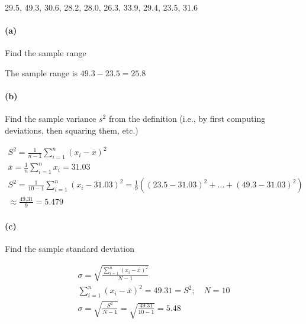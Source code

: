     29.5, 49.3, 30.6, 28.2, 28.0, 26.3, 33.9, 29.4, 23.5, 31.6

    \paragraph*{(a)}
    Find the sample range

    \begin{mdframed}
        The sample range is $49.3 - 23.5 = \boxed{25.8}$
    \end{mdframed}

    \paragraph*{(b)}
    Find the sample variance $s^2$ from the definition (i.e., by first computing deviations, then squaring them, etc.)

    \begin{mdframed}
        \begin{equation*}
            \begin{gathered}
                S^2 = \frac{1}{n-1}\sum_{i=1}^{n}(x_{i}-\overline{x})^2 \\
                \overline{x} = \frac{1}{n}\sum_{i=1}^{n}x_i = 31.03 \\
                S^2 = \frac{1}{10-1}\sum_{i=1}^{n}(x_{i}-31.03)^2 = \frac{1}{9}((23.5 - 31.03)^2 + \dots + (49.3 - 31.03)^2) \\
                \approx \frac{49.31}{9} = \boxed{5.479}
            \end{gathered}
        \end{equation*}
    \end{mdframed}

    \paragraph*{(c)}
    Find the sample standard deviation

    \begin{mdframed}
        \begin{equation*}
            \begin{gathered}
                \sigma = \sqrt{\frac{\sum\limits_{i=1}^{n}(x_i-\overline{x})^2}{N-1}} \\
                \sum_{i=1}^{n}(x_i-\overline{x})^2 = 49.31 = S^2; \quad N = 10 \\
                \sigma = \sqrt{\frac{S^2}{N-1}} = \sqrt{\frac{49.31}{10-1}} = \boxed{5.48}
            \end{gathered}
        \end{equation*}
    \end{mdframed}

